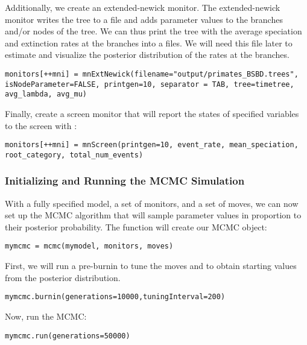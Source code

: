 Additionally, we create an extended-newick monitor.
The extended-newick monitor writes the tree to a file and adds parameter values to the branches and/or nodes of the tree.
We can thus print the tree with the average speciation and extinction rates at the branches into a files.
We will need this file later to estimate and visualize the posterior distribution of the rates at the branches.
{\tt \begin{snugshade*}
\begin{lstlisting}
monitors[++mni] = mnExtNewick(filename="output/primates_BSBD.trees", isNodeParameter=FALSE, printgen=10, separator = TAB, tree=timetree, avg_lambda, avg_mu)
\end{lstlisting}
\end{snugshade*}}

Finally, create a screen monitor that will report the states of specified variables to the screen with :
{\tt \begin{snugshade*}
\begin{lstlisting}
monitors[++mni] = mnScreen(printgen=10, event_rate, mean_speciation, root_category, total_num_events)
\end{lstlisting}
\end{snugshade*}}

\subsubsection{Initializing and Running the MCMC Simulation}

With a fully specified model, a set of monitors, and a set of moves, we can now set up the MCMC algorithm that will sample parameter values in proportion to their posterior probability. The  function will create our MCMC object:
{\tt \begin{snugshade*}
\begin{lstlisting}
mymcmc = mcmc(mymodel, monitors, moves)
\end{lstlisting}
\end{snugshade*}}

First, we will run a pre-burnin to tune the moves and to obtain starting values from the posterior distribution.
{\tt \begin{snugshade*}
\begin{lstlisting}
mymcmc.burnin(generations=10000,tuningInterval=200)
\end{lstlisting}
\end{snugshade*}}


Now, run the MCMC:
{\tt \begin{snugshade*}
\begin{lstlisting}
mymcmc.run(generations=50000)
\end{lstlisting}
\end{snugshade*}}

